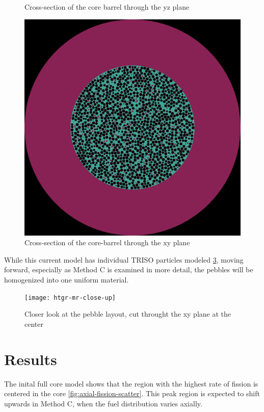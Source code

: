 \documentclass{anstrans}
\begin{document}
\begin{figure}[H]
  \caption{Cross-section of the core barrel through the yz plane}
  \label{fig:axial-xs}
\end{figure}

\begin{figure}[H]
  \centering
  \includegraphics[width = \linewidth]{htgr-mr-full-core-radial}
  \caption{Cross-section of the core-barrel through the xy plane}
  \label{fig:radial-xs}
\end{figure}

While this current model has individual TRISO particles modeled \ref{fig:radial-zoom}, moving forward, especially as Method C is examined in more detail, the pebbles will be homogenized into one uniform material.

\begin{figure}[H]
  \centering
  \texttt{[image: htgr-mr-close-up]}
  \caption{Closer look at the pebble layout, cut throught the xy plane at the center}
  \label{fig:radial-zoom}
\end{figure}

\section{Results}

The inital full core model shows that the region with the highest rate of fission is centered in the core \ref{fig:axial-fission-scatter}.  This peak region is expected to shift upwards in Method C, when the fuel distribution varies axially.
\end{document}

